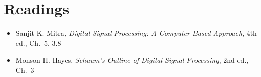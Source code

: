 \documentclass[handout_subfiles_root.tex]{subfiles}
\begin{document}
\section*{Readings}
\begin{itemize}
  \item Sanjit K. Mitra, \textit{Digital Signal Processing: A Computer-Based Approach}, 4th ed., Ch.\ 5, 3.8
  \item Monson H. Hayes, \textit{Schaum's Outline of Digital Signal Processing}, 2nd ed., Ch.\ 3
\end{itemize}

\HandoutAppendixListStart
\HandoutAppendixListEnd

\end{document}
